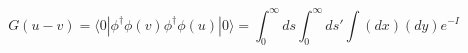 \begin{equation}
\label{2point}
G(u-v)=\langle 0| \phi^{\dagger}\phi(v)\phi^{\dagger}\phi (u)|0\rangle =\int_0^{\infty}ds\int_0^{\infty}ds'
\int (dx)(dy)e^{-I}
\end{equation}

